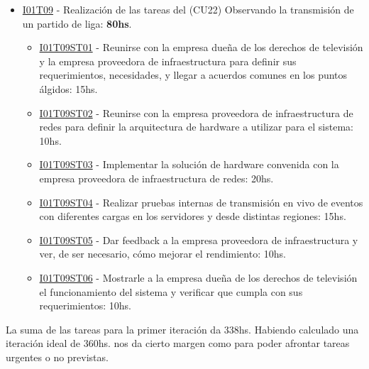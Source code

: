 \begin{itemize}
\item \underline{I01T09} - Realización de las tareas del (CU22) Observando la transmisión de un partido de liga: \textbf{80hs}.
  \begin{itemize}
    \item \underline{I01T09ST01} - Reunirse con la empresa dueña de los derechos de televisión y la empresa proveedora de infraestructura para definir sus requerimientos, necesidades, y llegar a acuerdos comunes en los puntos álgidos: 15hs.
    \item \underline{I01T09ST02} - Reunirse con la empresa proveedora de infraestructura de redes para definir la arquitectura de hardware a utilizar para el sistema: 10hs.
    \item \underline{I01T09ST03} - Implementar la solución de hardware convenida con la empresa proveedora de infraestructura de redes: 20hs.
    \item \underline{I01T09ST04} - Realizar pruebas internas de transmisión en vivo de eventos con diferentes cargas en los servidores y desde distintas regiones: 15hs.
    \item \underline{I01T09ST05} - Dar feedback a la empresa proveedora de infraestructura y ver, de ser necesario, cómo mejorar el rendimiento: 10hs.
    \item \underline{I01T09ST06} - Mostrarle a la empresa dueña de los derechos de televisión el funcionamiento del sistema y verificar que cumpla con sus requerimientos: 10hs.
  \end{itemize}
\hfill
\end{itemize}
La suma de las tareas para la primer iteración da 338hs. Habiendo calculado una iteración ideal de 360hs. nos da cierto margen como para poder afrontar tareas urgentes o no previstas.

